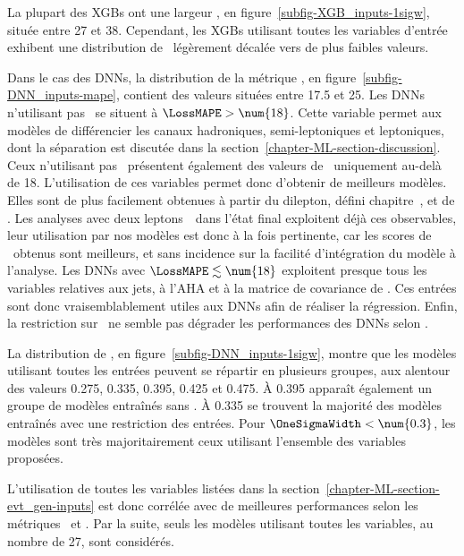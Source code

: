 \par
La plupart des XGBs ont
une largeur \OneSigmaWidth, en figure~\ref{subfig-XGB_inputs-1sigw},
située entre \num{27} et \num{38}.
Cependant,
les XGBs utilisant toutes les variables d'entrée
exhibent une distribution de \OneSigmaWidth\ légèrement décalée vers de plus faibles valeurs.
\par
Dans le cas des DNNs,
la distribution de la métrique \LossMAPE, en figure~\ref{subfig-DNN_inputs-mape},
contient des valeurs situées entre \num{17.5} et \num{25}.
Les DNNs n'utilisant pas \Nnu\
se situent à $\LossMAPE>\num{18}$.
Cette variable permet aux modèles de différencier les canaux
hadroniques, semi-leptoniques et leptoniques,
dont la séparation est discutée dans la section~\ref{chapter-ML-section-discussion}.
Ceux n'utilisant pas \mT\ présentent également des valeurs de \LossMAPE\ uniquement au-delà de \num{18}.
L'utilisation de ces variables permet donc d'obtenir de meilleurs modèles.
Elles sont de plus facilement obtenues à partir du dilepton, défini chapitre~, et de \MET.
Les analyses avec deux leptons~\tau\ dans l'état final exploitent déjà ces observables,
leur utilisation par nos modèles est donc à la fois
pertinente, car les scores de \LossMAPE\ obtenus sont meilleurs,
et
sans incidence sur la facilité d'intégration du modèle à l'analyse.
Les DNNs avec $\LossMAPE\lesssim\num{18}$
exploitent presque tous
les variables relatives aux jets, à l'AHA et à la matrice de covariance de \MET.
Ces entrées sont donc vraisemblablement utiles aux DNNs afin de réaliser la régression.
Enfin,
la restriction sur \Npu\
ne semble pas dégrader les performances des DNNs
selon \LossMAPE.
\par
La distribution de
\OneSigmaWidth, en figure~\ref{subfig-DNN_inputs-1sigw},
montre que les modèles utilisant toutes les entrées peuvent se répartir en plusieurs groupes,
aux alentour des valeurs
\num{0.275}, \num{0.335}, \num{0.395}, \num{0.425} et \num{0.475}.
À \num{0.395} apparaît également un groupe de modèles entraînés sans \mT.
À \num{0.335} se trouvent la majorité des modèles entraînés avec une restriction des entrées.
Pour $\OneSigmaWidth<\num{0.3}$, les modèles sont très majoritairement ceux utilisant l'ensemble des variables proposées.
\par
L'utilisation de toutes les variables listées dans la section~\ref{chapter-ML-section-evt_gen-inputs}
est donc corrélée avec de meilleures performances
selon les métriques
\LossMAPE\
et
\OneSigmaWidth.
Par la suite, seuls les modèles utilisant toutes les variables, au nombre de 27, sont considérés.
